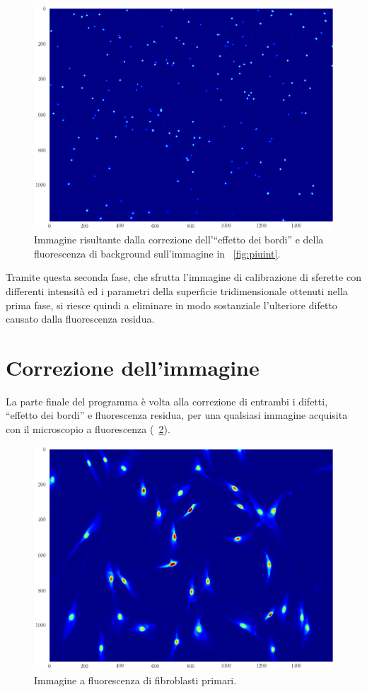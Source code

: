 \begin{figure}
 \centering
 \includegraphics[scale=.60]{img/CAP3piuintcorr.png}
 \caption{\small{Immagine risultante dalla correzione dell'``effetto dei bordi'' e della fluorescenza di background sull'immagine in \figurename~\ref{fig:piuint}.}}
 \label{fig:piuintcorr}
\end{figure}

Tramite questa seconda fase, che sfrutta l'immagine di calibrazione di sferette con differenti intensità ed i parametri della superficie tridimensionale ottenuti nella prima fase, si riesce quindi a eliminare in modo sostanziale l'ulteriore difetto causato dalla fluorescenza residua. 

\section{Correzione dell'immagine}

La parte finale del programma è volta alla correzione di entrambi i difetti, ``effetto dei bordi'' e fluorescenza residua, per una qualsiasi immagine acquisita con il microscopio a fluorescenza (\figurename~\ref{fig:cell}). 

\begin{figure}
 \centering
 \includegraphics[scale=.60]{img/CAP3cell.png}
 \caption{\small{Immagine a fluorescenza di fibroblasti primari.}}
 \label{fig:cell}
\end{figure}


